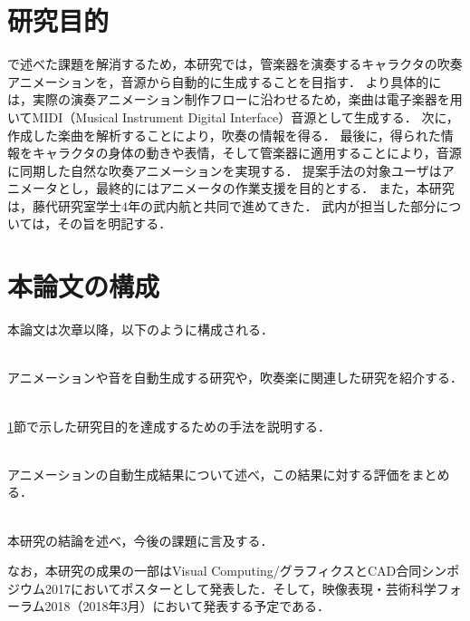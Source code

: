 \section{研究目的}\label{sec:purpose}
で述べた課題を解消するため，本研究では，管楽器を演奏するキャラクタの吹奏アニメーションを，音源から自動的に生成することを目指す．
より具体的には，実際の演奏アニメーション制作フローに沿わせるため，楽曲は電子楽器を用いてMIDI（Musical Instrument Digital Interface）音源として生成する．
次に，作成した楽曲を解析することにより，吹奏の情報を得る．
最後に，得られた情報をキャラクタの身体の動きや表情，そして管楽器に適用することにより，音源に同期した自然な吹奏アニメーションを実現する．
提案手法の対象ユーザはアニメータとし，最終的にはアニメータの作業支援を目的とする．
また，本研究は，藤代研究室学士4年の武内航と共同で進めてきた．
武内が担当した部分については，その旨を明記する．

\section{本論文の構成}\label{sec:structure}
本論文は次章以降，以下のように構成される．
\begin{description}
	\setlength{\itemindent}{4pt}
	\item[第2章 関連研究] \mbox{}\\
	\hspace{3ex}アニメーションや音を自動生成する研究や，吹奏楽に関連した研究を紹介する．
	\item[第3章 提案手法] \mbox{}\\
	\hspace{3ex} \ref{sec:purpose}節で示した研究目的を達成するための手法を説明する．
	\item[第4章 自動生成結果と評価] \mbox{}\\
	\hspace{3ex} アニメーションの自動生成結果について述べ，この結果に対する評価をまとめる．
	\item[第5章 結論] \mbox{}\\
	\hspace{3ex} 本研究の結論を述べ，今後の課題に言及する．
\end{description}
\indent
なお，本研究の成果の一部はVisual Computing/グラフィクスとCAD合同シンポジウム2017においてポスター\cite{vc}として発表した．そして，映像表現・芸術科学フォーラム2018（2018年3月）において発表する予定である．